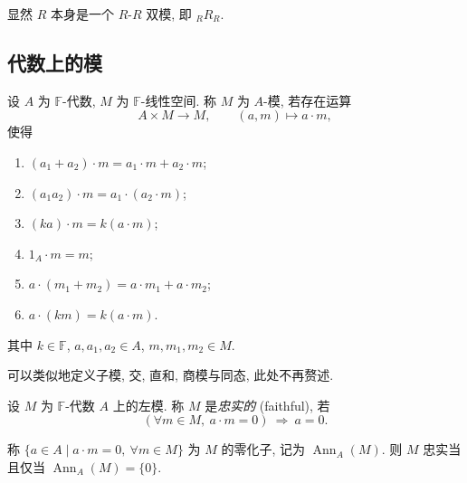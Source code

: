 \begin{example}\label{ex:bimodule-regular}
显然 $R$ 本身是一个 $R$-$R$ 双模, 即 ${}_RR_R$.
\end{example}

\subsection{代数上的模}

\begin{definition}[代数上的模]\label{def:algebra-module}
设 $A$ 为 $\mathbb{F}$-代数, $M$ 为 $\mathbb{F}$-线性空间. 称 $M$ 为 $A$-模, 若存在运算
\[
  A\times M\longrightarrow M,\qquad (a,m)\longmapsto a\cdot m,
\]
使得
\begin{enumerate}
  \item $(a_1+a_2)\cdot m=a_1\cdot m+a_2\cdot m$;
  \item $(a_1a_2)\cdot m=a_1\cdot(a_2\cdot m)$;
  \item $(ka)\cdot m=k(a\cdot m)$;
  \item $1_A\cdot m=m$;
  \item $a\cdot(m_1+m_2)=a\cdot m_1+a\cdot m_2$;
  \item $a\cdot(km)=k(a\cdot m)$.
\end{enumerate}
其中 $k\in \mathbb{F}$, $a,a_1,a_2\in A$, $m,m_1,m_2\in M$.
\end{definition}

\begin{remark}\label{rem:algebra-module-parallel}
可以类似地定义子模, 交, 直和, 商模与同态, 此处不再赘述.
\end{remark}

\begin{definition}[忠实模]\label{def:faithful-module}
设 $M$ 为 $\mathbb{F}$-代数 $A$ 上的左模. 称 $M$ 是\emph{忠实的} (faithful), 若
\[
  (\forall m\in M,\ a\cdot m=0)\ \Longrightarrow\ a=0 .
\]
\end{definition}

\begin{remark}[零化子]\label{rem:annihilator}
称 $\{a\in A\mid a\cdot m=0,\ \forall m\in M\}$ 为 $M$ 的零化子, 记为 $\operatorname{Ann}_A(M)$.
则 $M$ 忠实当且仅当 $\operatorname{Ann}_A(M)=\{0\}$.
\end{remark}
